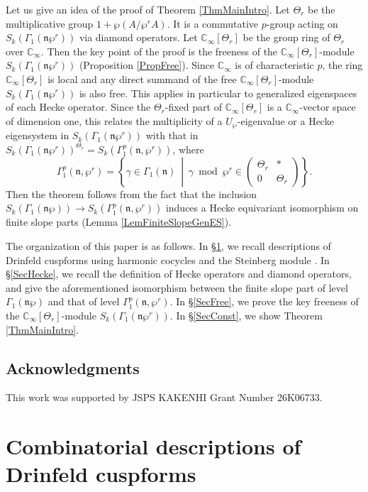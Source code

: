 \documentclass[11pt]{amsart}
\theoremstyle{plain}
\theoremstyle{definition}
\newcommand{\frn}{\mathfrak{n}}
\newcommand{\Cinf}{\mathbb{C}_{\infty}}
\begin{document}
Let us give an idea of the proof of Theorem \ref{ThmMainIntro}. Let $\Theta_r$ be the multiplicative group $1+\wp(A/\wp^r A)$. It is a commutative $p$-group acting 
on $S_k(\Gamma_1(\frn\wp^r))$ 
via diamond operators. Let $\Cinf[\Theta_r]$ be the group ring of $\Theta_r$ over $\Cinf$.
Then the key point of the proof is the freeness of the $\Cinf[\Theta_r]$-module $S_k(\Gamma_1(\frn\wp^r))$ (Proposition \ref{PropFree}). 
Since $\Cinf$ is of characteristic $p$, the ring $\Cinf[\Theta_r]$ is local and any direct summand of the free $
\Cinf[\Theta_r]$-module $S_k(\Gamma_1(\frn\wp^r))$ is also free. This applies in particular to generalized eigenspaces of each Hecke operator. Since the $
\Theta_r$-fixed part of $\Cinf[\Theta_r]$ is a $\Cinf$-vector space of dimension one, this relates the multiplicity of a 
$U_\wp$-eigenvalue or a Hecke eigensystem in $S_k(\Gamma_1(\frn\wp^r))$ with that in $S_k(\Gamma_1(\frn\wp^r))^{\Theta_r}=S_k(\Gamma_1^p(\frn,
\wp^r))$, where
\[
\Gamma_1^p(\frn,\wp^r)=\left\{\gamma\in \Gamma_1(\frn)\ \middle|\ \gamma\bmod \wp^r\in\begin{pmatrix}
	\Theta_r & *\\0& \Theta_r
\end{pmatrix}\right\}.
\]
Then the theorem follows from the fact that the inclusion $S_k(\Gamma_1(\frn\wp))\to S_k(\Gamma_1^p(\frn,\wp^r))$ induces a Hecke equivariant isomorphism on finite slope parts (Lemma \ref{LemFiniteSlopeGenES}). 

The organization of this paper is as follows. In \S\ref{SecHC}, we recall descriptions of Drinfeld cuspforms using harmonic cocycles and the Steinberg module 
\cite{Tei}. In \S\ref{SecHecke}, we recall the definition of Hecke operators and diamond operators, and
give the aforementioned isomorphism between the finite slope part of level $\Gamma_1(\frn\wp)$ and that of level $\Gamma_1^p(\frn,\wp^r)$.
In \S\ref{SecFree}, we prove the key freeness of the $\Cinf[\Theta_r]$-module 
$S_k(\Gamma_1(\frn\wp^r))$. In \S\ref{SecConst}, we show Theorem \ref{ThmMainIntro}. 

\subsection*{Acknowledgments} This work was supported by JSPS KAKENHI Grant Number 	26K06733.


\section{Combinatorial descriptions of Drinfeld cuspforms}\label{SecHC}
\end{document}
